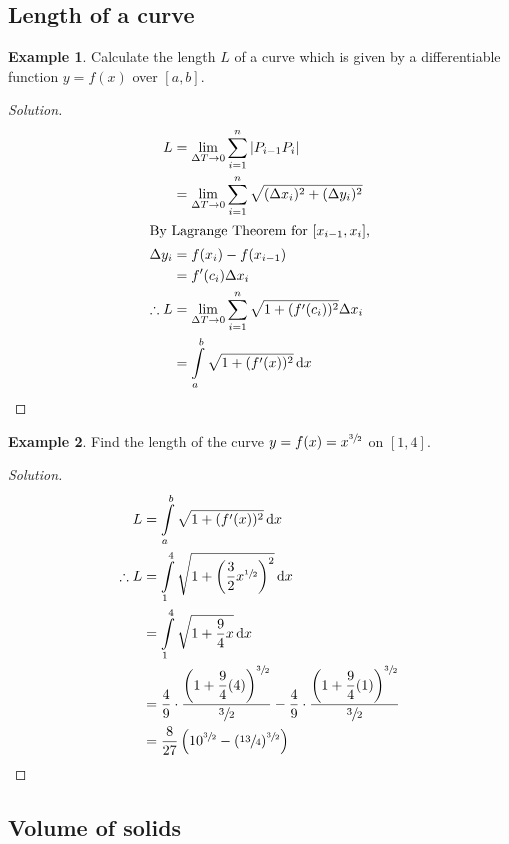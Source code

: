 \documentclass[fleqn, a4paper, 12pt]{article}
\theoremstyle{definition}
\newtheorem{example}{Example}
\theoremstyle{theorem}
\theoremstyle{remark}
\newenvironment{solution}
{\begin{proof}[Solution]\let\qed\relax}
	{\end{proof}}
\begin{document}
\subsection{Length of a curve}

\begin{example}
	Calculate the length $L$ of a curve which is given by a differentiable function $y = f(x)$ over $[a, b]$.
\end{example}

\begin{solution}
	\begin{align*}
		L &= \lim\limits_{\Delta T \to 0} \sum_{i = 1}^{n} |P_{i-1} P_i|\\
		&= \lim\limits_{\Delta T \to 0} \sum_{i = 1}^{n} \sqrt{(\Delta x_i)^2 + (\Delta y_i)^2}\\
		\intertext{By Lagrange Theorem for $[x_{i-1}, x_i]$,}
		\Delta y_i &= f(x_i) - f(x_{i-1})\\
		&= f'(c_i) \Delta x_i\\
		\therefore L &= \lim\limits_{\Delta T \to 0} \sum_{i = 1}^{n} \sqrt{1 + (f'(c_i))^2} \Delta x_i\\
		&= \int\limits_{a}^{b} \sqrt{1 + (f'(x))^2} \dif x
	\end{align*}
\end{solution}

\begin{example}
	Find the length of the curve $y = f(x) = x^{\sfrac{3}{2}}$ on $[1, 4]$.
\end{example}

\begin{solution}
	\begin{align*}
		L &= \int\limits_{a}^{b} \sqrt{1 + (f'(x))^2} \dif x\\
		\therefore L &= \int\limits_{1}^{4} \sqrt{1 + \left( \dfrac{3}{2} x^{\sfrac{1}{2}} \right)^2} \dif x\\
		&= \int\limits_{1}^{4} \sqrt{1 + \dfrac{9}{4} x} \dif x\\
		&= \dfrac{4}{9} \cdot \dfrac{\left( 1 + \dfrac{9}{4} (4) \right)^{\sfrac{3}{2}}}{\sfrac{3}{2}} - \dfrac{4}{9} \cdot \dfrac{\left( 1 + \dfrac{9}{4} (1) \right)^{\sfrac{3}{2}}}{\sfrac{3}{2}}\\
		&= \dfrac{8}{27} \left( 10^{\sfrac{3}{2}} - (\sfrac{13}{4})^{\sfrac{3}{2}} \right)
	\end{align*}
\end{solution}

\subsection{Volume of solids}
\end{document}
